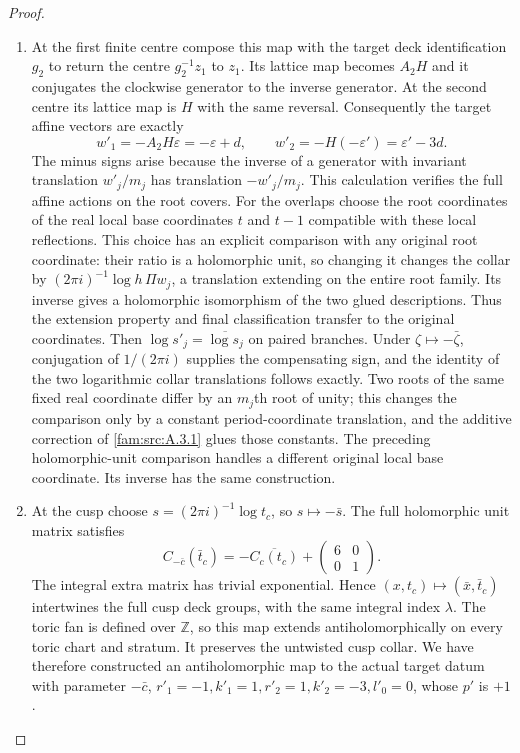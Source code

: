 \begin{proof}
\begin{enumerate}[label=\arabic*.,leftmargin=*]
\item At the first finite centre compose this map with the target deck identification $g_2$ to return the centre $g_2^{-1}z_1$ to $z_1$. Its lattice map becomes $A_2H$ and it conjugates the clockwise generator to the inverse generator. At the second centre its lattice map is $H$ with the same reversal. Consequently the target affine vectors are exactly
\[
 w'_1=-A_2H\varepsilon=-\varepsilon+d,\qquad
 w'_2=-H(-\varepsilon')=\varepsilon'-3d.
\]
The minus signs arise because the inverse of a generator with invariant translation $w'_j/m_j$ has translation $-w'_j/m_j$. This calculation verifies the full affine actions on the root covers. For the overlaps choose the root coordinates of the real local base coordinates $t$ and $t-1$ compatible with these local reflections. This choice has an explicit comparison with any original root coordinate: their ratio is a holomorphic unit, so changing it changes the collar by $(2\pi i)^{-1}\log h\,\Pi w_j$, a translation extending on the entire root family. Its inverse gives a holomorphic isomorphism of the two glued descriptions. Thus the extension property and final classification transfer to the original coordinates. Then $\log s'_j=\overline{\log s_j}$ on paired branches. Under $\zeta\mapsto-\bar\zeta$, conjugation of $1/(2\pi i)$ supplies the compensating sign, and the identity of the two logarithmic collar translations follows exactly. Two roots of the same fixed real coordinate differ by an $m_j$th root of unity; this changes the comparison only by a constant period-coordinate translation, and the additive correction of \ref{fam:src:A.3.1} glues those constants. The preceding holomorphic-unit comparison handles a different original local base coordinate. Its inverse has the same construction.

\item At the cusp choose $s=(2\pi i)^{-1}\log t_c$, so $s\mapsto-\bar s$. The full holomorphic unit matrix satisfies
\[
 C_{-\bar c}(\bar t_c)=-\overline{C_c(t_c)}+
       \begin{pmatrix}6&0\\0&1\end{pmatrix}.
\]
The integral extra matrix has trivial exponential. Hence $(x,t_c)\mapsto(\bar x,\bar t_c)$ intertwines the full cusp deck groups, with the same integral index $\lambda$. The toric fan is defined over $\mathbb Z$, so this map extends antiholomorphically on every toric chart and stratum. It preserves the untwisted cusp collar. We have therefore constructed an antiholomorphic map to the actual target datum with parameter $-\bar c$, $r'_1=-1,k'_1=1,r'_2=1,k'_2=-3,l'_0=0$, whose $p'$ is $+1$.


\end{enumerate}
\end{proof}
